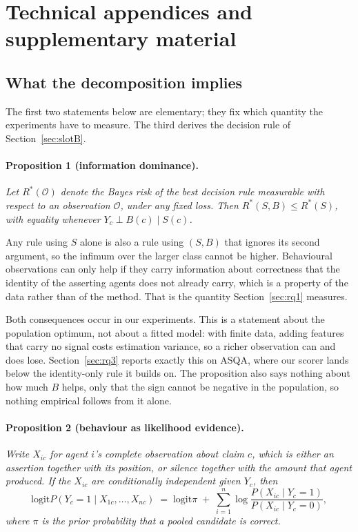\documentclass{article}
\begin{document}

{\small}


\appendix

\section{Technical appendices and supplementary material}

\subsection{What the decomposition implies}
\label{sec:theory}

The first two statements below are elementary; they fix which quantity the experiments have to measure. The third derives the decision rule of Section~\ref{sec:slotB}.

\paragraph{Proposition 1 (information dominance).}
\emph{Let $R^*(\mathcal{O})$ denote the Bayes risk of the best decision rule measurable with respect to an observation $\mathcal{O}$, under any fixed loss. Then $R^*(S,B) \leq R^*(S)$, with equality whenever $Y_c \perp B(c) \mid S(c)$.}

Any rule using $S$ alone is also a rule using $(S,B)$ that ignores its second argument, so the infimum over the larger class cannot be higher. Behavioural observations can only help if they carry information about correctness that the identity of the asserting agents does not already carry, which is a property of the data rather than of the method. That is the quantity Section~\ref{sec:rq1} measures.

Both consequences occur in our experiments. This is a statement about the population optimum, not about a fitted model: with finite data, adding features that carry no signal costs estimation variance, so a richer observation can and does lose. Section~\ref{sec:rq3} reports exactly this on ASQA, where our scorer lands below the identity-only rule it builds on. The proposition also says nothing about how much $B$ helps, only that the sign cannot be negative in the population, so nothing empirical follows from it alone.

\paragraph{Proposition 2 (behaviour as likelihood evidence).}
\emph{Write $X_{ic}$ for agent $i$'s complete observation about claim $c$, which is either an assertion together with its position, or silence together with the amount that agent produced. If the $X_{ic}$ are conditionally independent given $Y_c$, then}
\[
  \mathrm{logit} P(Y_c = 1 \mid X_{1c}, \dots, X_{nc})
  \;=\; \mathrm{logit} \pi \;+\; \sum_{i=1}^{n} \log \frac{P(X_{ic} \mid Y_c = 1)}{P(X_{ic} \mid Y_c = 0)} ,
\]
\emph{where $\pi$ is the prior probability that a pooled candidate is correct.}
\end{document}
